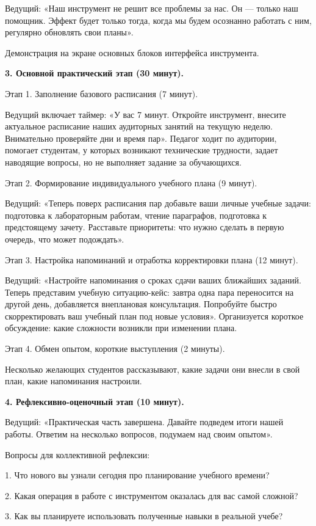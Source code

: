 \documentclass[
]{article}
\begin{document}
Ведущий: «Наш инструмент не решит все проблемы за нас. Он --- только наш
помощник. Эффект будет только тогда, когда мы будем осознанно работать с
ним, регулярно обновлять свои планы».

Демонстрация на экране основных блоков интерфейса инструмента.

\textbf{3. Основной практический этап (30 минут).}

Этап 1. Заполнение базового расписания (7 минут).

Ведущий включает таймер: «У вас 7 минут. Откройте инструмент, внесите
актуальное расписание наших аудиторных занятий на текущую неделю.
Внимательно проверяйте дни и время пар». Педагог ходит по аудитории,
помогает студентам, у которых возникают технические трудности, задает
наводящие вопросы, но не выполняет задание за обучающихся.

Этап 2. Формирование индивидуального учебного плана (9 минут).

Ведущий: «Теперь поверх расписания пар добавьте ваши личные учебные
задачи: подготовка к лабораторным работам, чтение параграфов, подготовка
к предстоящему зачету. Расставьте приоритеты: что нужно сделать в первую
очередь, что может подождать».

Этап 3. Настройка напоминаний и отработка корректировки плана (12
минут).

Ведущий: «Настройте напоминания о сроках сдачи ваших ближайших заданий.
Теперь представим учебную ситуацию-кейс: завтра одна пара переносится на
другой день, добавляется внеплановая консультация. Попробуйте быстро
скорректировать ваш учебный план под новые условия». Организуется
короткое обсуждение: какие сложности возникли при изменении плана.

Этап 4. Обмен опытом, короткие выступления (2 минуты).

Несколько желающих студентов рассказывают, какие задачи они внесли в
свой план, какие напоминания настроили.

\textbf{4. Рефлексивно-оценочный этап (10 минут).}

Ведущий: «Практическая часть завершена. Давайте подведем итоги нашей
работы. Ответим на несколько вопросов, подумаем над своим опытом».

Вопросы для коллективной рефлексии:

1. Что нового вы узнали сегодня про планирование учебного времени?

2. Какая операция в работе с инструментом оказалась для вас самой
сложной?

3. Как вы планируете использовать полученные навыки в реальной учебе?
\end{document}
